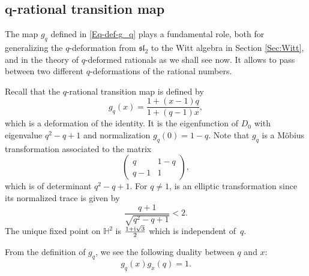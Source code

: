 \documentclass[10pt,a4paper]{amsart}
\numberwithin{equation}{section}
\renewcommand*{\H}{\mathbb{H}}
\begin{document}
\subsection[q-rational transition map]{$\boldsymbol{q}$-rational transition map}\label{Sec:Ovsienko}

The map $g_q$ defined in \eqref{Eq-def-g_q} plays a fundamental role, both for generalizing the $q$-deformation from $\mathfrak{sl}_2$ to the Witt algebra in Section \ref{Sec:Witt}, and in the theory of $q$-deformed rationals as we shall see now. It allows to pass between two different $q$-deformations of the rational numbers.

Recall that the $q$-rational transition map is defined by
\[
g_q(x)=\frac{1+(x-1)q}{1+(q-1)x},
\]
which is a deformation of the identity. It is the eigenfunction of $D_0$ with eigenvalue $q^2-q+1$ and normalization $g_q(0)=1-q$.
Note that $g_q$ is a M\"obius transformation associated to the matrix
\[
\begin{pmatrix} q & 1-q \\ q-1 & 1\end{pmatrix},
\]
which is of determinant $q^2-q+1$. For $q\neq 1$,  is an elliptic transformation since its normalized trace is given by
\[
\frac{q+1}{\sqrt{q^2-q+1}}<2.
\] The unique fixed point on $\H^2$ is $\tfrac{1+{\rm i}\sqrt{3}}{2}$ which is independent of~$q$.

From the definition of $g_q$, we see the following duality between $q$ and $x$:
\[
g_q(x)g_x(q)=1.\]
\end{document}
